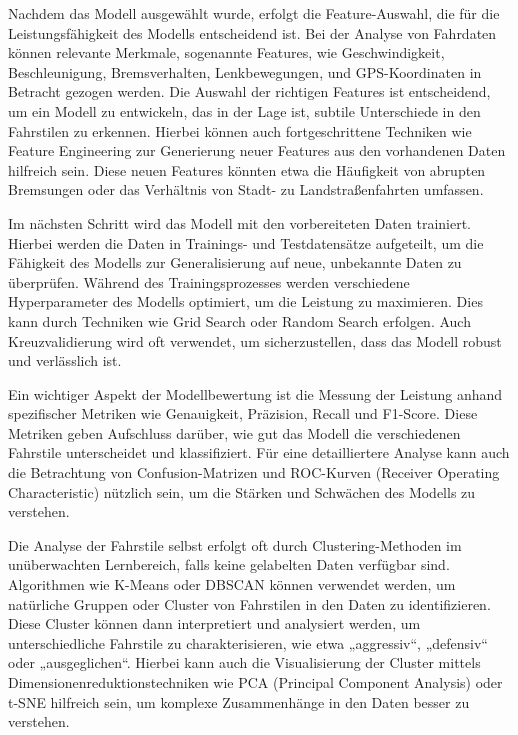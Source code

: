 \documentclass[oneside]{ausarbeitung}
\begin{document}
\begin{itemize}
  Nachdem das Modell ausgewählt wurde, erfolgt die Feature-Auswahl, die für die Leistungsfähigkeit des Modells entscheidend ist. Bei der Analyse von Fahrdaten können relevante Merkmale, sogenannte Features, wie Geschwindigkeit, Beschleunigung, Bremsverhalten, Lenkbewegungen, und GPS-Koordinaten in Betracht gezogen werden. Die Auswahl der richtigen Features ist entscheidend, um ein Modell zu entwickeln, das in der Lage ist, subtile Unterschiede in den Fahrstilen zu erkennen. Hierbei können auch fortgeschrittene Techniken wie Feature Engineering zur Generierung neuer Features aus den vorhandenen Daten hilfreich sein. Diese neuen Features könnten etwa die Häufigkeit von abrupten Bremsungen oder das Verhältnis von Stadt- zu Landstraßenfahrten umfassen.
  
  Im nächsten Schritt wird das Modell mit den vorbereiteten Daten trainiert. Hierbei werden die Daten in Trainings- und Testdatensätze aufgeteilt, um die Fähigkeit des Modells zur Generalisierung auf neue, unbekannte Daten zu überprüfen. Während des Trainingsprozesses werden verschiedene Hyperparameter des Modells optimiert, um die Leistung zu maximieren. Dies kann durch Techniken wie Grid Search oder Random Search erfolgen. Auch Kreuzvalidierung wird oft verwendet, um sicherzustellen, dass das Modell robust und verlässlich ist.
  
  Ein wichtiger Aspekt der Modellbewertung ist die Messung der Leistung anhand spezifischer Metriken wie Genauigkeit, Präzision, Recall und F1-Score. Diese Metriken geben Aufschluss darüber, wie gut das Modell die verschiedenen Fahrstile unterscheidet und klassifiziert. Für eine detailliertere Analyse kann auch die Betrachtung von Confusion-Matrizen und ROC-Kurven (Receiver Operating Characteristic) nützlich sein, um die Stärken und Schwächen des Modells zu verstehen.
  
  Die Analyse der Fahrstile selbst erfolgt oft durch Clustering-Methoden im unüberwachten Lernbereich, falls keine gelabelten Daten verfügbar sind. Algorithmen wie K-Means oder DBSCAN können verwendet werden, um natürliche Gruppen oder Cluster von Fahrstilen in den Daten zu identifizieren. Diese Cluster können dann interpretiert und analysiert werden, um unterschiedliche Fahrstile zu charakterisieren, wie etwa „aggressiv“, „defensiv“ oder „ausgeglichen“. Hierbei kann auch die Visualisierung der Cluster mittels Dimensionenreduktionstechniken wie PCA (Principal Component Analysis) oder t-SNE hilfreich sein, um komplexe Zusammenhänge in den Daten besser zu verstehen.
  

\end{itemize}
\end{document}
